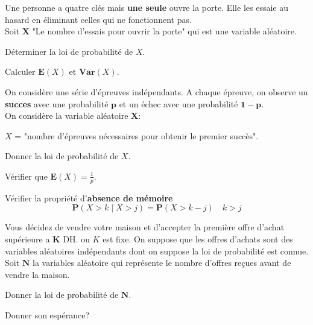 \documentclass[11pt,largemargins]{homework}
\begin{document}

Une personne a quatre clés mais \textbf{une seule} ouvre la porte. Elle les
essaie au hasard en éliminant celles qui ne fonctionnent pas.\\

Soit \textbf{X} "Le nombre d'essais pour ouvrir la porte" qui est une variable
aléatoire.

\begin{arabicparts}
    \item Déterminer la loi de probabilité de $X$.
    \item Calculer $\mathbf{E}(X)$ et $\mathbf{Var}(X)$.
\end{arabicparts}



On considère une série d'épreuves indépendants. A chaque  épreuve, on observe un
\textbf{succes} avec une probabilité $\mathbf{p}$ et un échec avec une probabilité
$\mathbf{1-p}$.\\

On considère la variable aléatoire $\mathbf{X}$:

$X$ = "nombre d'épreuves nécessaires pour obtenir le premier succès".\\

\begin{arabicparts}
    \item Donner la loi de probabilité de $X$.
    \item Vérifier que $\mathbf{E}(X) = \frac{1}{p}$.
    \item Vérifier la propriété d'\textbf{absence de mémoire}
      $$
      \mathbf{P}(X > k\;|\; X > j) = \mathbf{P}(X >  k-j )\quad k > j
      $$
    \item Vous décidez de vendre votre maison et d'accepter  la première offre
      d'achat supérieure a $\mathbf{K}$ DH. ou $K$ est fixe. On suppose que les
      offres d'achats sont des variables aléatoires indépendants dont on suppose
      la loi de probabilité est connue.\\

      Soit $\mathbf{N}$ la variables aléatoire qui représente le nombre
      d'offres reçues avant de vendre la maison.

      \begin{arabicparts}
      \item Donner la loi de probabilité de $\mathbf{N}$.
      \item Donner son espérance?
      \end{arabicparts}
\end{arabicparts}
\end{document}
